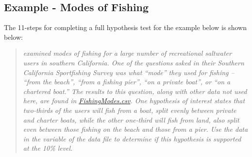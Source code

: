 \documentclass[10pt,openany]{book}\usepackage[]{graphicx}\usepackage[]{color}
\begin{document}
\subsection{Example - Modes of Fishing}
The 11-steps  for completing a full hypothesis test for the example below is shown below:

\begin{quote}
\textsl{\cite{HerrigesKing1999} examined modes of fishing for a large number of recreational saltwater users in southern California.  One of the questions asked in their Southern California Sportfishing Survey was what ``mode'' they used for fishing -- ``from the beach'', ``from a fishing pier'', ``on a private boat'', or ``on a chartered boat.''  The results to this question, along with other data not used here, are found in \href{https://raw.githubusercontent.com/droglenc/NCData/master/FishingModes.csv}{FishingModes.csv}.  One hypothesis of interest states that two-thirds of the users will fish from a boat, split evenly between private and charter boats, while the other one-third will fish from land, also split even between those fishing on the beach and those from a pier.  Use the data in the  variable of the data file to determine if this hypothesis is supported at the 10\% level.}
\end{quote}
\end{document}
